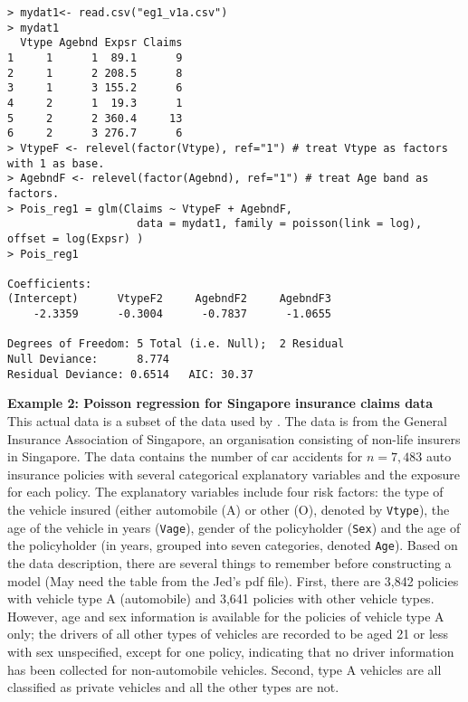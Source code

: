 \documentclass[12pt]{article}
\begin{document}
 \begin{verbatim}
> mydat1<- read.csv("eg1_v1a.csv")
> mydat1
  Vtype Agebnd Expsr Claims
1     1      1  89.1      9
2     1      2 208.5      8
3     1      3 155.2      6
4     2      1  19.3      1
5     2      2 360.4     13
6     2      3 276.7      6
> VtypeF <- relevel(factor(Vtype), ref="1") # treat Vtype as factors with 1 as base.
> AgebndF <- relevel(factor(Agebnd), ref="1") # treat Age band as factors.
> Pois_reg1 = glm(Claims ~ VtypeF + AgebndF,
	                data = mydat1, family = poisson(link = log), offset = log(Expsr) )
> Pois_reg1

Coefficients:
(Intercept)      VtypeF2     AgebndF2     AgebndF3  
    -2.3359      -0.3004      -0.7837      -1.0655  

Degrees of Freedom: 5 Total (i.e. Null);  2 Residual
Null Deviance:	    8.774 
Residual Deviance: 0.6514 	AIC: 30.37
\end{verbatim}
\vspace{1cm}
\noindent\textbf{Example 2: Poisson regression for Singapore insurance claims data}\\
This actual data is a subset of the data used by \cite{Frees+Valde:08a}. The data is from the General Insurance Association of Singapore, an organisation consisting of non-life insurers in Singapore. The data contains the number of car accidents for $n=7,483$ auto insurance policies with several categorical explanatory variables and the exposure for each policy. The explanatory variables include four risk factors: the type of the vehicle insured (either automobile (A) or other (O), denoted by \verb"Vtype"), the age of the vehicle in years (\verb"Vage"), gender of the policyholder (\verb"Sex") and  the age of the policyholder (in years, grouped into seven categories, denoted \verb"Age").  
Based on the data description, there are several things to remember before constructing a model (May need the table from the Jed's pdf file). 
First, there are 3,842 policies with vehicle type A (automobile) and 3,641 policies with other vehicle types. However, age and sex  information is available for the policies of vehicle type A only; the drivers of all other types of vehicles are recorded to be aged 21 or less with sex unspecified, except for one policy, indicating that no driver information has been collected for non-automobile vehicles. Second, type A vehicles are all classified as  private vehicles and all the other types are not.\\
\end{document}

